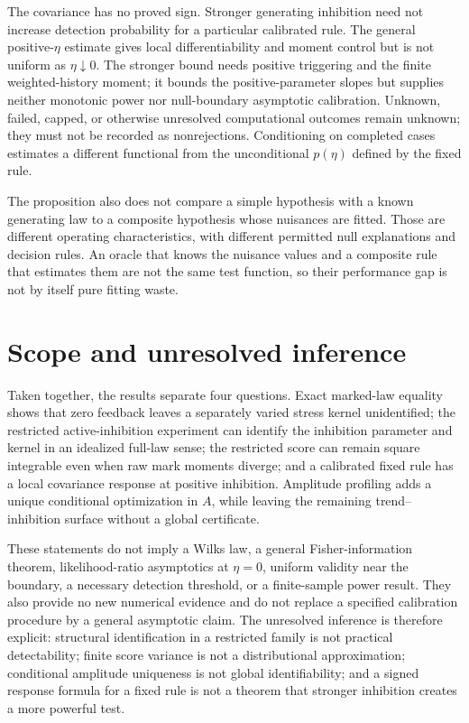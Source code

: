 The covariance has no proved sign. Stronger generating inhibition need not increase detection probability for a particular calibrated rule. The general positive-\(\eta\) estimate gives local differentiability and moment control but is not uniform as \(\eta\downarrow0\). The stronger bound needs positive triggering and the finite weighted-history moment; it bounds the positive-parameter slopes but supplies neither monotonic power nor null-boundary asymptotic calibration. Unknown, failed, capped, or otherwise unresolved computational outcomes remain unknown; they must not be recorded as nonrejections. Conditioning on completed cases estimates a different functional from the unconditional \(p(\eta)\) defined by the fixed rule.

The proposition also does not compare a simple hypothesis with a known generating law to a composite hypothesis whose nuisances are fitted. Those are different operating characteristics, with different permitted null explanations and decision rules. An oracle that knows the nuisance values and a composite rule that estimates them are not the same test function, so their performance gap is not by itself pure fitting waste.

\section{Scope and unresolved inference}

Taken together, the results separate four questions. Exact marked-law equality shows that zero feedback leaves a separately varied stress kernel unidentified; the restricted active-inhibition experiment can identify the inhibition parameter and kernel in an idealized full-law sense; the restricted score can remain square integrable even when raw mark moments diverge; and a calibrated fixed rule has a local covariance response at positive inhibition. Amplitude profiling adds a unique conditional optimization in \(A\), while leaving the remaining trend--inhibition surface without a global certificate.

These statements do not imply a Wilks law, a general Fisher-information theorem, likelihood-ratio asymptotics at \(\eta=0\), uniform validity near the boundary, a necessary detection threshold, or a finite-sample power result. They also provide no new numerical evidence and do not replace a specified calibration procedure by a general asymptotic claim. The unresolved inference is therefore explicit: structural identification in a restricted family is not practical detectability; finite score variance is not a distributional approximation; conditional amplitude uniqueness is not global identifiability; and a signed response formula for a fixed rule is not a theorem that stronger inhibition creates a more powerful test.
